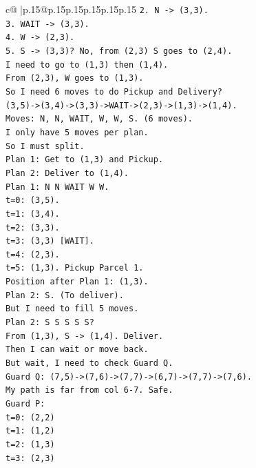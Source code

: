 \documentclass{article}
\begin{document}
{\begin{supertabular}{c@{$\;$}|p{.15\linewidth}@{}p{.15\linewidth}p{.15\linewidth}p{.15\linewidth}p{.15\linewidth}p{.15\linewidth}}
{{{\texttt{2. N {-}> (3,3).} \\
\texttt{3. WAIT {-}> (3,3).} \\
\texttt{4. W {-}> (2,3).} \\
\texttt{5. S {-}> (3,3)? No, from (2,3) S goes to (2,4).} \\
\texttt{I need to go to (1,3) then (1,4).} \\
\texttt{From (2,3), W goes to (1,3).} \\
\texttt{So I need 6 moves to do Pickup and Delivery?} \\
\texttt{(3,5){-}>(3,4){-}>(3,3){-}>WAIT{-}>(2,3){-}>(1,3){-}>(1,4).} \\
\texttt{Moves: N, N, WAIT, W, W, S. (6 moves).} \\
\texttt{I only have 5 moves per plan.} \\
\texttt{So I must split.} \\
\texttt{Plan 1: Get to (1,3) and Pickup.} \\
\texttt{Plan 2: Deliver to (1,4).} \\
\texttt{Plan 1: N N WAIT W W.} \\
\texttt{t=0: (3,5).} \\
\texttt{t=1: (3,4).} \\
\texttt{t=2: (3,3).} \\
\texttt{t=3: (3,3) {[}WAIT{]}.} \\
\texttt{t=4: (2,3).} \\
\texttt{t=5: (1,3). Pickup Parcel 1.} \\
\texttt{Position after Plan 1: (1,3).} \\
\texttt{Plan 2: S. (To deliver).} \\
\texttt{But I need to fill 5 moves.} \\
\texttt{Plan 2: S S S S S?} \\
\texttt{From (1,3), S {-}> (1,4). Deliver.} \\
\texttt{Then I can wait or move back.} \\
\texttt{But wait, I need to check Guard Q.} \\
\texttt{Guard Q: (7,5){-}>(7,6){-}>(7,7){-}>(6,7){-}>(7,7){-}>(7,6).} \\
\texttt{My path is far from col 6{-}7. Safe.} \\
\texttt{Guard P:} \\
\texttt{t=0: (2,2)} \\
\texttt{t=1: (1,2)} \\
\texttt{t=2: (1,3)} \\
\texttt{t=3: (2,3)} \\
}}}
\end{supertabular}}
\end{document}
